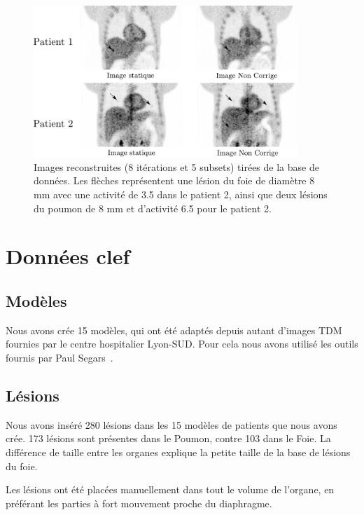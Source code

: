 \begin{figure}
 \centering
 \includegraphics[width=10cm]{images/exempleImageRecon}
 \caption[Images reconstruites tirées de la base de donnée]{Images reconstruites (8 itérations et 5 subsets) tirées de la base de données. Les flèches représentent une lésion du foie de diamètre 8 mm avec une activité de 3.5 dans le patient 2, ainsi que deux lésions du poumon de 8 mm et d'activité 6.5 pour le patient 2.}
 \label{fig:exempleImageRecon}
\end{figure}



\section{Données clef} %

\subsection{Modèles}

Nous avons crée 15 modèles, qui ont été adaptés depuis autant d'images TDM fournies par le centre hospitalier Lyon-SUD. Pour cela nous avons utilisé les outils fournis par Paul Segars~\cite{segars2001These}.


\subsection{Lésions}

Nous avons inséré 280 lésions dans les 15 modèles de patients que nous avons crée. 173 lésions sont présentes dans le Poumon, contre 103 dans le Foie. La différence de taille entre les organes explique la petite taille de la base de lésions du foie. 

Les lésions ont été placées manuellement dans tout le volume de l'organe, en préférant les parties à fort mouvement proche du diaphragme. 

